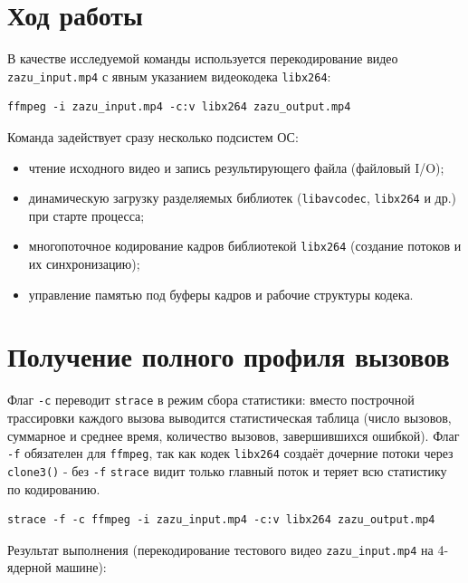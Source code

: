 \documentclass[12pt,a4paper]{article}
\begin{document}
\section{Ход работы}
В качестве исследуемой команды используется перекодирование видео
\texttt{zazu\_input.mp4} с явным указанием видеокодека
\texttt{libx264}:

\begin{lstlisting}
ffmpeg -i zazu_input.mp4 -c:v libx264 zazu_output.mp4
\end{lstlisting}

Команда задействует сразу несколько подсистем ОС:
\begin{itemize}
    \item чтение исходного видео и запись результирующего файла (файловый I/O);
    \item динамическую загрузку разделяемых библиотек (\texttt{libavcodec},
          \texttt{libx264} и др.) при старте процесса;
    \item многопоточное кодирование кадров библиотекой \texttt{libx264}
          (создание потоков и их синхронизацию);
    \item управление памятью под буферы кадров и рабочие структуры кодека.
\end{itemize}

\section{Получение полного профиля вызовов}

Флаг \texttt{-c} переводит \texttt{strace} в режим сбора статистики: вместо построчной
трассировки каждого вызова выводится статистическая таблица (число вызовов,
суммарное и среднее время, количество вызовов, завершившихся ошибкой). Флаг \texttt{-f}
обязателен для \texttt{ffmpeg}, так как кодек \texttt{libx264} создаёт дочерние потоки
через \texttt{clone3()} - без \texttt{-f} \texttt{strace} видит только главный поток и
теряет всю статистику по кодированию.

\begin{lstlisting}
strace -f -c ffmpeg -i zazu_input.mp4 -c:v libx264 zazu_output.mp4
\end{lstlisting}

Результат выполнения (перекодирование тестового видео \texttt{zazu\_input.mp4} на
4-ядерной машине):
\end{document}
